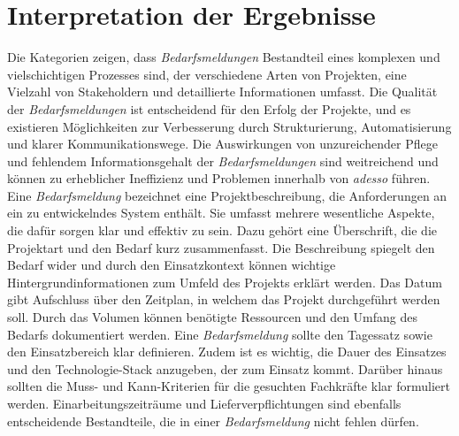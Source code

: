 \section{Interpretation der Ergebnisse}
Die Kategorien zeigen, dass \emph{Bedarfsmeldungen} Bestandteil eines komplexen und vielschichtigen Prozesses sind, der verschiedene Arten von Projekten, eine Vielzahl von Stakeholdern und detaillierte Informationen umfasst. Die Qualität der \emph{Bedarfsmeldungen} ist entscheidend für den Erfolg der Projekte, und es existieren Möglichkeiten zur Verbesserung durch Strukturierung, Automatisierung und klarer Kommunikationswege. Die Auswirkungen von unzureichender Pflege und fehlendem Informationsgehalt der \emph{Bedarfsmeldungen} sind weitreichend und können zu erheblicher Ineffizienz und Problemen innerhalb von \emph{adesso} führen.\\

Eine \emph{Bedarfsmeldung} bezeichnet eine Projektbeschreibung, die Anforderungen an ein zu entwickelndes System enthält. Sie umfasst mehrere wesentliche Aspekte, die dafür sorgen klar und effektiv zu sein. Dazu gehört eine Überschrift, die die Projektart und den Bedarf kurz zusammenfasst. Die Beschreibung spiegelt den Bedarf wider und durch den Einsatzkontext können wichtige Hintergrundinformationen zum Umfeld des Projekts erklärt werden. Das Datum gibt Aufschluss über den Zeitplan, in welchem das Projekt durchgeführt werden soll. Durch das Volumen können benötigte Ressourcen und den Umfang des Bedarfs dokumentiert werden. Eine \emph{Bedarfsmeldung} sollte den Tagessatz sowie den Einsatzbereich klar definieren. Zudem ist es wichtig, die Dauer des Einsatzes und den Technologie-Stack anzugeben, der zum Einsatz kommt. Darüber hinaus sollten die Muss- und Kann-Kriterien für die gesuchten Fachkräfte klar formuliert werden. Einarbeitungszeiträume und Lieferverpflichtungen sind ebenfalls entscheidende Bestandteile, die in einer \emph{Bedarfsmeldung} nicht fehlen dürfen.\\
